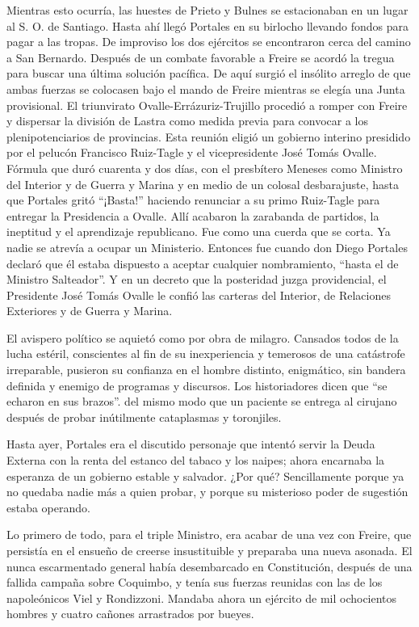 \documentclass[10pt,twoside,openright]{memoir}
\begin{document}
Mientras esto ocurría, las huestes de Prieto y Bulnes se estacionaban en
un lugar al S. O. de Santiago. Hasta ahí llegó Portales en su birlocho
llevando fondos para pagar a las tropas. De improviso los dos ejércitos
se encontraron cerca del camino a San Bernardo. Después de un combate
favorable a Freire se acordó la tregua para buscar una última solución
pacífica. De aquí surgió el insólito arreglo de que
ambas fuerzas se colocasen bajo el mando de Freire mientras se elegía
una Junta provisional. El triunvirato Ovalle-Errázuriz-Trujillo procedió
a romper con Freire y dispersar la división de Lastra como medida previa
para convocar a los plenipotenciarios de provincias. Esta reunión eligió
un gobierno interino presidido por el pelucón Francisco Ruiz-Tagle y
el vicepresidente José Tomás Ovalle. Fórmula que duró cuarenta y dos días, con el
presbítero Meneses como Ministro del Interior y de Guerra y Marina y en
medio de un colosal desbarajuste, hasta que Portales gritó ``¡Basta!''
haciendo renunciar a su primo Ruiz-Tagle para entregar la Presidencia a
Ovalle. Allí acabaron la zarabanda de
partidos, la ineptitud y el aprendizaje republicano. Fue como una cuerda
que se corta. Ya nadie se atrevía a ocupar un Ministerio. Entonces fue
cuando don Diego Portales declaró que él estaba dispuesto a aceptar
cualquier nombramiento, ``hasta el de Ministro Salteador''. Y en un
decreto que la posteridad juzga providencial, el Presidente José Tomás
Ovalle le confió las carteras del Interior, de Relaciones Exteriores y
de Guerra y Marina.

El avispero político se aquietó como por obra de milagro. Cansados todos
de la lucha estéril, conscientes al fin de su inexperiencia y temerosos
de una catástrofe irreparable, pusieron su confianza en el
hombre distinto, enigmático, sin
bandera definida y enemigo de programas y discursos. Los historiadores
dicen que ``se echaron en sus brazos''. del mismo modo que un paciente se
entrega al cirujano después de probar inútilmente cataplasmas y
toronjiles.

Hasta ayer, Portales era el discutido personaje que intentó servir la
Deuda Externa con la renta del estanco del tabaco y los naipes; ahora
encarnaba la esperanza de un gobierno estable y salvador. ¿Por qué?
Sencillamente porque ya no quedaba nadie más a quien probar, y porque su
misterioso poder de sugestión estaba operando.

Lo primero de todo, para el triple Ministro, era acabar de una vez con
Freire, que persistía en el ensueño
de creerse insustituible y preparaba una nueva asonada. El nunca
escarmentado general había desembarcado en Constitución, después de una
fallida campaña sobre Coquimbo, y tenía sus fuerzas reunidas con las de
los napoleónicos Viel y Rondizzoni. Mandaba ahora un ejército de mil
ochocientos hombres y cuatro cañones
arrastrados por bueyes.
\end{document}
